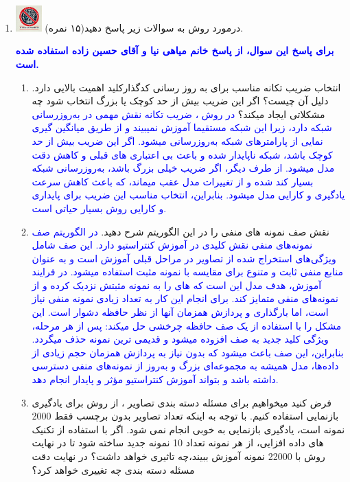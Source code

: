 \documentclass[12pt]{article}
\begin{document}
\begin{enumerate}
    \item \includegraphics[width=1cm]{figs/Forbidden_AI.jpg}
        درمورد روش  به سوالات زیر پاسخ دهید(۱۵ نمره).
        
        \textcolor{blue}{\textbf{برای پاسخ این سوال، از پاسخ خانم میاهی نیا و آقای حسین زاده استفاده شده است.}}
        \begin{enumerate}
            \item   انتخاب ضریب تکانه مناسب برای به روز رسانی کدگذارکلید  اهمیت بالایی دارد. دلیل آن چیست؟ اگر این ضریب بیش از حد کوچک یا بزرگ انتخاب شود چه مشکلاتی ایجاد میکند؟
            \textcolor{blue}{در روش ، ضریب تکانه نقش مهمی در به‌روزرسانی شبکه  دارد، زیرا این شبکه مستقیما آموزش نمیبیند و از طریق میانگین گیری نمایی از پارامترهای شبکه  به‌روزرسانی میشود. اگر این ضریب بیش از حد کوچک باشد، شبکه  ناپایدار شده و باعث بی اعتباری  های قبلی و کاهش دقت مدل میشود. از طرف دیگر، اگر ضریب خیلی بزرگ باشد، به‌روزرسانی شبکه   بسیار کند شده و از تغییرات مدل عقب میماند، که باعث کاهش سرعت یادگیری و کارایی مدل میشود. بنابراین، انتخاب مناسب این ضریب برای پایداری و کارایی روش بسیار حیاتی است.}
            \item نقش صف نمونه های منفی را در این الگوریتم شرح دهید.
            \textcolor{blue}{
            در الگوریتم  صف نمونه‌های منفی نقش کلیدی در آموزش کنتراستیو دارد. این صف شامل ویژگی‌های استخراج شده از تصاویر  در مراحل قبلی آموزش است و به عنوان منابع منفی ثابت و متنوع برای مقایسه با نمونه مثبت استفاده میشود. در فرایند آموزش، هدف مدل این است که  های  را به نمونه مثبتش نزدیک کرده و از نمونه‌های منفی متمایز کند. برای انجام این کار به تعداد زیادی نمونه منفی نیاز است، اما بارگذاری و پردازش همزمان آنها از نظر حافظه دشوار است.  این مشکل را با استفاده از یک صف حافظه چرخشی حل میکند: پس از هر مرحله، ویژگی کلید جدید به صف افزوده میشود و قدیمی ترین نمونه حذف میگردد. بنابراین، این صف باعث میشود که بدون نیاز به پردازش همزمان حجم زیادی از داده‌ها، مدل همیشه به مجموعه‌ای بزرگ و به‌روز از نمونه‌های منفی دسترسی داشته باشد و بتواند آموزش کنتراستیو مؤثر و پایدار انجام دهد.
            }
            \item    فرض کنید میخواهیم برای مسئله دسته بندی تصاویر ، از روش  برای یادگیری بازنمایی استفاده کنیم.  با توجه به  اینکه تعداد تصاویر بدون  برچسب فقط 2000 نمونه است، یادگیری بازنمایی به خوبی انجام نمی شود. اگر با استفاده از تکنیک های داده افزایی، از هر نمونه تعداد 10 نمونه جدید ساخته شود تا در نهایت روش  با 22000 نمونه آموزش ببیند،چه  تاثیری خواهد  داشت؟ در نهایت دقت مسئله  دسته بندی چه تغییری خواهد کرد؟

\end{enumerate}
\end{enumerate}
\end{document}
